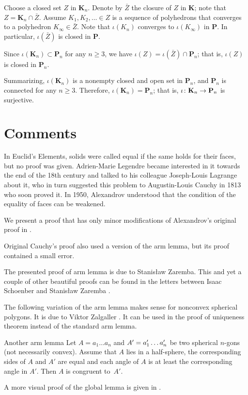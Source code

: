 Choose a closed set $Z$ in $\mathbf{K}_n$.
Denote by $\bar Z$ the closure of $Z$ in $\mathbf{K}$; note that $Z=\mathbf{K}_n\cap \bar Z$.
Assume $K_1,K_2,\dots\in Z$ is a sequence of polyhedrons that converges to a polyhedron $K_\infty\in\bar Z$.
Note that $\iota(K_n)$ converges to $\iota(K_\infty)$ in $\mathbf{P}$.
In particular, $\iota(\bar Z)$ is closed in $\mathbf{P}$.

Since $\iota(\mathbf{K}_n)\subset \mathbf{P}_n$ for any $n\ge 3$, we have $\iota (Z)=\iota(\bar Z)\cap \mathbf{P}_n$;
that is, $\iota (Z)$ is closed in $\mathbf{P}_n$. 

\medskip

Summarizing, $\iota(\mathbf{K}_n)$ is a nonempty closed and open set in $\mathbf{P}_n$, and $\mathbf{P}_n$ is connected for any $n\ge 3$.
Therefore, $\iota(\mathbf{K}_n)=\mathbf{P}_n$; that is, $\iota\:\mathbf{K}_n\z\to\mathbf{P}_n$ is surjective.
\qeds

\section{Comments}

In Euclid's Elements, 
solids were called equal if the same holds for their faces, but no proof was given.
Adrien-Marie Legendre became interested in it towards the end of the 18th century and
talked to his colleague Joseph-Louis Lagrange about it, who in turn suggested this problem to Augustin-Louis Cauchy in 1813 who soon proved it.
In 1950, Alexandrov understood that the condition of the equality of faces can be weakened.

We present a proof that has only minor modifications of Alexandrov's original proof in \cite{alexandrov}.


Original Cauchy's proof \cite{cauchy}
also used a version of the arm lemma, 
but its proof contained a small error.

The presented proof of arm lemma is due to Stanisław Zaremba.
This and yet a couple of other beautiful proofs can be found in the letters between Isaac Schoenber and Stanisław Zaremba \cite{schoenberg-zaremba}.

The following variation of the arm lemma makes sense for nonconvex spherical polygons.
It is due to Viktor Zalgaller \cite{zalgaller}.
It can be used in the proof of uniqueness theorem instead of the standard arm lemma.

\begin{thm}{Another arm lemma}
Let $A=a_1\dots a_n$ and $A'\z=a'_1\z\dots a'_n$ be two spherical $n$-gons (not necessarily convex).
Assume that $A$ lies in a half-sphere,
the corresponding sides of $A$ and $A'$ are equal
and each angle of $A$ is at least the corresponding angle in $A'$.
Then $A$ is congruent to~$A'$. 
\end{thm}

A more visual proof of the global lemma is given in \cite[II \S 1.3]{alexandrov}.
